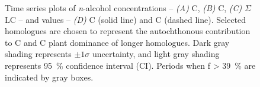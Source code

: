 \begin{figure}[p]
	\caption[\textit{n}-alcohol concentration and  time-series plots]{Time series plots of \textit{n}-alcohol concentrations -- \textit{(A)} C, \textit{(B)} C, \textit{(C)} $\Sigma$LC -- and  values -- \textit{(D)} C (solid line) and C (dashed line). Selected homologues are chosen to represent the autochthonous contribution to C and C plant dominance of longer homologues. Dark gray shading represents $\pm 1\sigma$ uncertainty, and light gray shading represents \SI{95}{\%} confidence interval (CI). Periods when f \SI{> 39}{\%} are indicated by gray boxes.}
	\label{Ch4Fig:6} 
\end{figure}

